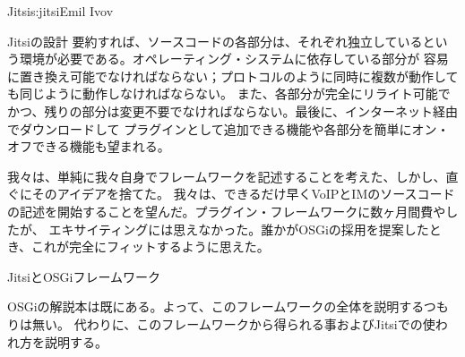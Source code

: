 \begin{aosachapter}{Jitsi}{s:jitsi}{Emil Ivov}
\begin{aosasect1}{Jitsiの設計}
要約すれば、ソースコードの各部分は、それぞれ独立しているという環境が必要である。オペレーティング・システムに依存している部分が
容易に置き換え可能でなければならない；プロトコルのように同時に複数が動作しても同じように動作しなければならない。
また、各部分が完全にリライト可能でかつ、残りの部分は変更不要でなければならない。最後に、インターネット経由でダウンロードして
プラグインとして追加できる機能や各部分を簡単にオン・オフできる機能も望まれる。

我々は、単純に我々自身でフレームワークを記述することを考えた、しかし、直ぐにそのアイデアを捨てた。
我々は、できるだけ早くVoIPとIMのソースコードの記述を開始することを望んだ。プラグイン・フレームワークに数ヶ月間費やしたが、
エキサイティングには思えなかった。誰かがOSGiの採用を提案したとき、これが完全にフィットするように思えた。

\end{aosasect1}

\begin{aosasect1}{JitsiとOSGiフレームワーク}

OSGiの解説本は既にある。よって、このフレームワークの全体を説明するつもりは無い。
代わりに、このフレームワークから得られる事およびJitsiでの使われ方を説明する。


\end{aosasect1}
\end{aosachapter}
